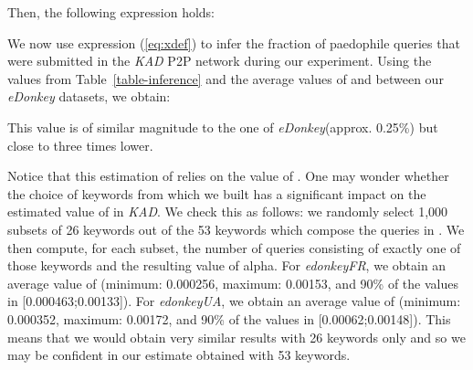 \documentclass[a4paper,oneside,12pt]{article}
\newcommand{\edonkey}{{\em eDonkey}\xspace}
\newcommand{\edonkeydsfr}{{\em edonkeyFR}\xspace}
\newcommand{\edonkeydsua}{{\em edonkeyUA}\xspace}
\newcommand{\kad}{{\em KAD}\xspace}
\begin{document}
Then, the following expression holds: 


We now use expression (\ref{eq:xdef}) to infer the fraction of paedophile queries that were submitted in the \kad P2P network during our experiment. Using the values from Table~\ref{table-inference} and the average values of  and  between our \edonkey datasets, we obtain: 


This value is of similar magnitude to the one of \edonkey (approx.
0.25\%) but close to three times lower. 

Notice that this estimation of  relies on the value of . One may wonder whether the choice of keywords from which we built  has a significant impact on the estimated value of  in \kad. We check this as follows: we randomly select 1,000 subsets of 26 keywords out of the 53 keywords which compose the queries in . We then compute, for each subset, the number of queries consisting of exactly one of those keywords and the resulting value of alpha. For \edonkeydsfr, we obtain an average value of  (minimum: 0.000256, maximum: 0.00153, and 90\% of the values in [0.000463;0.00133]). For \edonkeydsua, we obtain an average value of  (minimum: 0.000352, maximum: 0.00172, and 90\% of the values in [0.00062;0.00148]). This means that we would obtain very similar results with 26 keywords only and so we may be confident in our estimate obtained with 53 keywords. 
\end{document}
